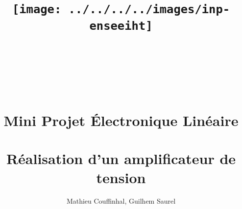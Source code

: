 \documentclass[11pt;a4paper]{report}
\title{\texttt{[image: ../../../../images/inp-enseeiht]} \\ ~ \\ ~ \\ ~ \\ ~ \\ Mini Projet Électronique Linéaire \\ ~ \\ \large{Réalisation d'un amplificateur de tension}}
\author{Mathieu Couffinhal, Guilhem Saurel}
\date{\oldstylenums{\today}}
\begin{document}
 \begin{titlepage}
  \maketitle
 \end{titlepage}


 \tableofcontents
 
 
 
 
 
 
\end{document}
